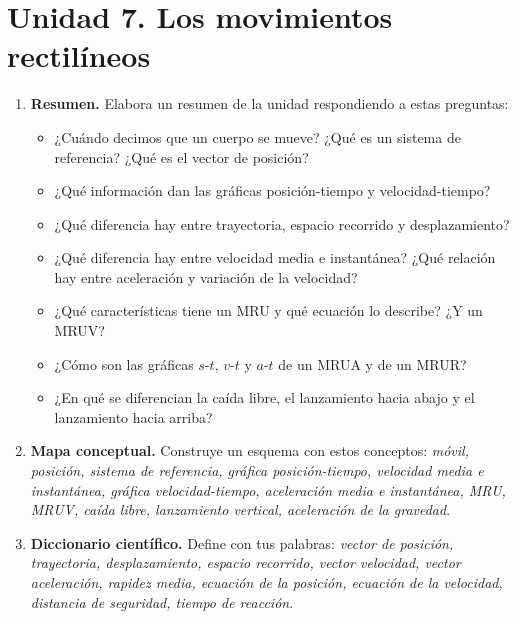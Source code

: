 \section{Unidad 7. Los movimientos rectilíneos}

\begin{enumerate}[label=\numberballred]
    \item \textbf{Resumen.} Elabora un resumen de la unidad respondiendo a estas preguntas:
    \begin{itemize}
        \item ¿Cuándo decimos que un cuerpo se mueve? ¿Qué es un sistema de referencia? ¿Qué es el vector de posición?
        \item ¿Qué información dan las gráficas posición-tiempo y velocidad-tiempo?
        \item ¿Qué diferencia hay entre trayectoria, espacio recorrido y desplazamiento?
        \item ¿Qué diferencia hay entre velocidad media e instantánea? ¿Qué relación hay entre aceleración y variación de la velocidad?
        \item ¿Qué características tiene un MRU y qué ecuación lo describe? ¿Y un MRUV?
        \item ¿Cómo son las gráficas \(s\)-\(t\), \(v\)-\(t\) y \(a\)-\(t\) de un MRUA y de un MRUR?
        \item ¿En qué se diferencian la caída libre, el lanzamiento hacia abajo y el lanzamiento hacia arriba?
    \end{itemize}
    \item \textbf{Mapa conceptual.} Construye un esquema con estos conceptos: \emph{móvil, posición, sistema de referencia, gráfica posición-tiempo, velocidad media e instantánea, gráfica velocidad-tiempo, aceleración media e instantánea, MRU, MRUV, caída libre, lanzamiento vertical, aceleración de la gravedad}.
    \item \textbf{Diccionario científico.} Define con tus palabras: \emph{vector de posición, trayectoria, desplazamiento, espacio recorrido, vector velocidad, vector aceleración, rapidez media, ecuación de la posición, ecuación de la velocidad, distancia de seguridad, tiempo de reacción}.
\end{enumerate}


